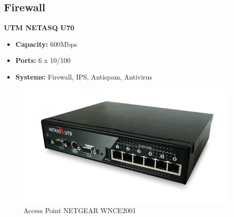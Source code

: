 \subsection{Firewall}
\textbf{UTM NETASQ U70}
\begin{itemize}
	\item \textbf{Capacity:} 600Mbps
	\item \textbf{Ports:} 6 x 10/100
	\item \textbf{Systems:} Firewall, IPS, Antispam, Antivirus  
\end{itemize}
 \begin{figure}[htbp]
	\begin{center}
        \includegraphics[scale = 0.5]{img/firewall.jpg}
        \caption{Access Point NETGEAR WNCE2001}
    \end{center}
\end{figure}